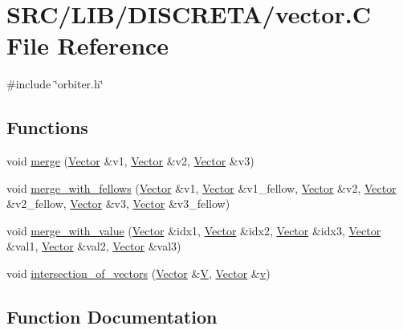 \hypertarget{vector_8_c}{}\section{S\+R\+C/\+L\+I\+B/\+D\+I\+S\+C\+R\+E\+T\+A/vector.C File Reference}
\label{vector_8_c}
{\ttfamily \#include \char`\"{}orbiter.\+h\char`\"{}}\newline
\subsection*{Functions}
\begin{DoxyCompactItemize}
\item 
void \mbox{\hyperlink{vector_8_c_a310cecde8237fbd947415a851ec9d863}{merge}} (\mbox{\hyperlink{class_vector}{Vector}} \&v1, \mbox{\hyperlink{class_vector}{Vector}} \&v2, \mbox{\hyperlink{class_vector}{Vector}} \&v3)
\item 
void \mbox{\hyperlink{vector_8_c_ad0c537ed72189444f04920bd1ec09452}{merge\+\_\+with\+\_\+fellows}} (\mbox{\hyperlink{class_vector}{Vector}} \&v1, \mbox{\hyperlink{class_vector}{Vector}} \&v1\+\_\+fellow, \mbox{\hyperlink{class_vector}{Vector}} \&v2, \mbox{\hyperlink{class_vector}{Vector}} \&v2\+\_\+fellow, \mbox{\hyperlink{class_vector}{Vector}} \&v3, \mbox{\hyperlink{class_vector}{Vector}} \&v3\+\_\+fellow)
\item 
void \mbox{\hyperlink{vector_8_c_a2471b9bb8555afd2c10f48fc09ce2a06}{merge\+\_\+with\+\_\+value}} (\mbox{\hyperlink{class_vector}{Vector}} \&idx1, \mbox{\hyperlink{class_vector}{Vector}} \&idx2, \mbox{\hyperlink{class_vector}{Vector}} \&idx3, \mbox{\hyperlink{class_vector}{Vector}} \&val1, \mbox{\hyperlink{class_vector}{Vector}} \&val2, \mbox{\hyperlink{class_vector}{Vector}} \&val3)
\item 
void \mbox{\hyperlink{vector_8_c_ac712c3886c120c8d2b85ace0de698008}{intersection\+\_\+of\+\_\+vectors}} (\mbox{\hyperlink{class_vector}{Vector}} \&\mbox{\hyperlink{srg_8_c_af40a326b23c68a27cebe60f16634a2cb}{V}}, \mbox{\hyperlink{class_vector}{Vector}} \&\mbox{\hyperlink{simeon_8_c_aeb3f3030944801b163bc3b829a7f6710}{v}})
\end{DoxyCompactItemize}


\subsection{Function Documentation}
\mbox{\label{vector_8_c_ac712c3886c120c8d2b85ace0de698008}} 
